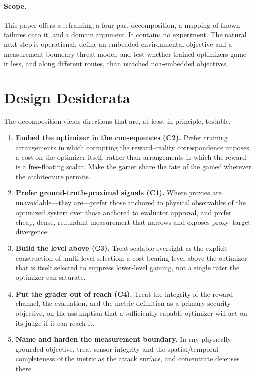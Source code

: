 \documentclass[11pt]{article}
\begin{document}
\paragraph{Scope.} This paper offers a reframing, a four-part decomposition, a mapping of known failures onto it, and a domain argument. It contains no experiment. The natural next step is operational: define an embedded environmental objective and a measurement-boundary threat model, and test whether trained optimizers game it less, and along different routes, than matched non-embedded objectives.

\section{Design Desiderata}\label{sec:design}

The decomposition yields directions that are, at least in principle, testable.

\begin{enumerate}[leftmargin=1.4em,itemsep=0.2em]
\item \textbf{Embed the optimizer in the consequences (C2).} Prefer training arrangements in which corrupting the reward--reality correspondence imposes a cost on the optimizer itself, rather than arrangements in which the reward is a free-floating scalar. Make the gamer share the fate of the gamed wherever the architecture permits.
\item \textbf{Prefer ground-truth-proximal signals (C1).} Where proxies are unavoidable---they are---prefer those anchored to physical observables of the optimized system over those anchored to evaluator approval, and prefer cheap, dense, redundant measurement that narrows and exposes proxy--target divergence.
\item \textbf{Build the level above (C3).} Treat scalable oversight as the explicit construction of multi-level selection: a cost-bearing level above the optimizer that is itself selected to suppress lower-level gaming, not a single rater the optimizer can saturate.
\item \textbf{Put the grader out of reach (C4).} Treat the integrity of the reward channel, the evaluation, and the metric definition as a primary security objective, on the assumption that a sufficiently capable optimizer will act on its judge if it can reach it.
\item \textbf{Name and harden the measurement boundary.} In any physically grounded objective, treat sensor integrity and the spatial/temporal completeness of the metric as the attack surface, and concentrate defenses there.
\end{enumerate}
\end{document}
